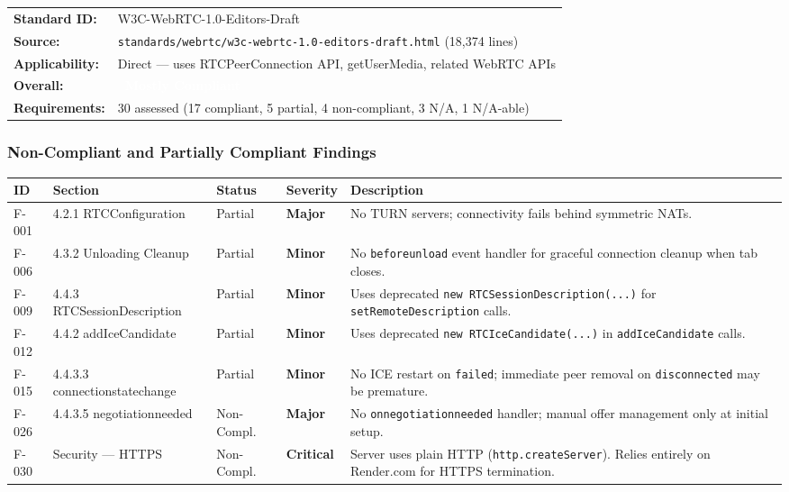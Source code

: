 \documentclass[11pt,letterpaper]{article}
\newcommand{\mostlycompliant}{\colorbox{partial}{\textcolor{white}{\textbf{\small~Mostly Compliant~}}}}
\newcommand{\sevcritical}{\textcolor{critical}{\textbf{Critical}}}
\newcommand{\sevmajor}{\textcolor{major}{\textbf{Major}}}
\newcommand{\sevminor}{\textcolor{minor!80!black}{\textbf{Minor}}}
\begin{document}
\begin{tabular}{ll}
\textbf{Standard ID:} & W3C-WebRTC-1.0-Editors-Draft \\
\textbf{Source:} & \texttt{standards/webrtc/w3c-webrtc-1.0-editors-draft.html} (18,374 lines) \\
\textbf{Applicability:} & Direct --- uses RTCPeerConnection API, getUserMedia, related WebRTC APIs \\
\textbf{Overall:} & \mostlycompliant \\
\textbf{Requirements:} & 30 assessed (17 compliant, 5 partial, 4 non-compliant, 3 N/A, 1 N/A-able) \\
\end{tabular}

\subsubsection{Non-Compliant and Partially Compliant Findings}

\begin{longtable}{C{1cm}L{2.8cm}C{1.5cm}C{1.2cm}L{6.7cm}}
\toprule
\textbf{ID} & \textbf{Section} & \textbf{Status} & \textbf{Severity} & \textbf{Description} \\
\midrule
\endhead
F-001 & 4.2.1 RTCConfiguration & Partial & \sevmajor & No TURN servers; connectivity fails behind symmetric NATs. \\
\midrule
F-006 & 4.3.2 Unloading Cleanup & Partial & \sevminor & No \texttt{beforeunload} event handler for graceful connection cleanup when tab closes. \\
\midrule
F-009 & 4.4.3 RTCSessionDescription & Partial & \sevminor & Uses deprecated \texttt{new RTCSessionDescription(...)} for \texttt{setRemoteDescription} calls. \\
\midrule
F-012 & 4.4.2 addIceCandidate & Partial & \sevminor & Uses deprecated \texttt{new RTCIceCandidate(...)} in \texttt{addIceCandidate} calls. \\
\midrule
F-015 & 4.4.3.3 connectionstatechange & Partial & \sevminor & No ICE restart on \texttt{failed}; immediate peer removal on \texttt{disconnected} may be premature. \\
\midrule
F-026 & 4.4.3.5 negotiationneeded & Non-Compl. & \sevmajor & No \texttt{onnegotiationneeded} handler; manual offer management only at initial setup. \\
\midrule
F-030 & Security --- HTTPS & Non-Compl. & \sevcritical & Server uses plain HTTP (\texttt{http.createServer}). Relies entirely on Render.com for HTTPS termination. \\
\bottomrule
\end{longtable}
\end{document}
